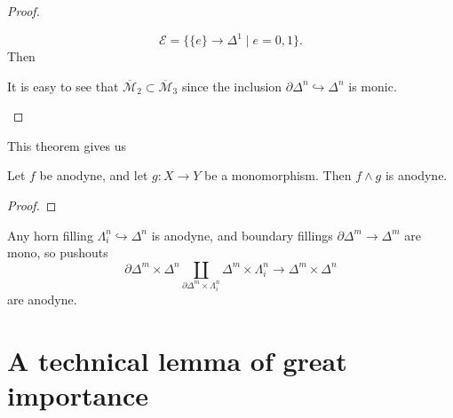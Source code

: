 \documentclass[main.tex]{subfiles}
\begin{document}
\begin{proof}
\begin{enumerate}
      \begin{equation*}
        \mathcal{E} = \{\{e\} \to \Delta^{1} \mid e = 0, 1\}.
      \end{equation*}
      Then

      It is easy to see that $\overline{\mathcal{M}}_{2} \subset \overline{\mathcal{M}}_{3}$ since the inclusion $\partial \Delta^{n} \hookrightarrow \Delta^{n}$ is monic.
  \end{enumerate}

\end{proof}

This theorem gives us 

\begin{corollary}
  \label{cor:smash_of_monic_and_anodyne_is_anodyne}
  Let $f$ be anodyne, and let $g\colon X \to Y$ be a monomorphism. Then $f \wedge g$ is anodyne.
\end{corollary}
\begin{proof}

\end{proof}

\begin{example}
  \label{eg:boundary_filling_times_horn_filling_is_anodyne}
  Any horn filling $\Lambda^{n}_{i} \hookrightarrow \Delta^{n}$ is anodyne, and boundary fillings $\partial \Delta^{m} \to \Delta^{m}$ are mono, so pushouts
  \begin{equation*}
    \partial \Delta^{m} \times \Delta^{n} \coprod_{\partial \Delta^{m} \times \Lambda^{n}_{i}} \Delta^{m} \times \Lambda^{n}_{i} \to \Delta^{m} \times \Delta^{n}
  \end{equation*}
  are anodyne.
\end{example}

\section{A technical lemma of great importance}
\label{sec:a_technical_lemma_of_great_importance}
\end{document}
